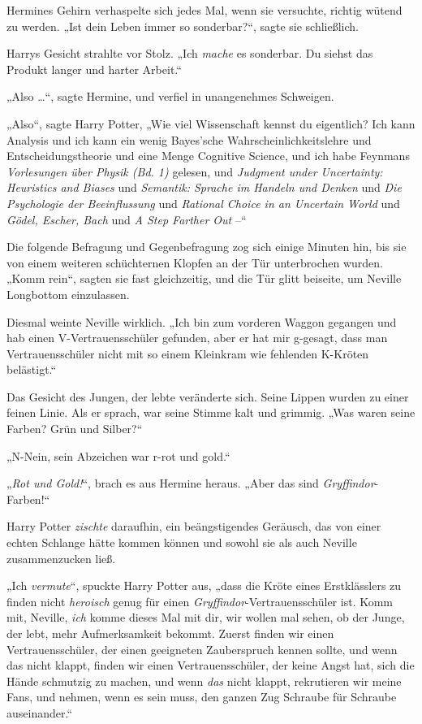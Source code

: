 Hermines Gehirn verhaspelte sich jedes Mal, wenn sie versuchte, richtig wütend zu werden. „Ist dein Leben immer so sonderbar?“, sagte sie schließlich. 

Harrys Gesicht strahlte vor Stolz. „Ich \emph{mache} es sonderbar. Du siehst das Produkt langer und harter Arbeit.“ 

„Also …“, sagte Hermine, und verfiel in unangenehmes Schweigen. 

„Also“, sagte Harry Potter, „Wie viel Wissenschaft kennst du eigentlich? Ich kann Analysis und ich kann ein wenig Bayes'sche Wahrscheinlichkeitslehre und Entscheidungstheorie und eine Menge Cognitive Science, und ich habe Feynmans \emph{Vorlesungen über Physik (Bd. 1)} gelesen, und \emph{Judgment under Uncertainty: Heuristics and Biases} und \emph{Semantik: Sprache im Handeln und Denken} und \emph{Die Psychologie der Beeinflussung} und \emph{Rational Choice in an Uncertain World} und \emph{Gödel, Escher, Bach} und \emph{A Step Farther Out} –“ 

Die folgende Befragung und Gegenbefragung zog sich einige Minuten hin, bis sie von einem weiteren schüchternen Klopfen an der Tür unterbrochen wurden. „Komm rein“, sagten sie fast gleichzeitig, und die Tür glitt beiseite, um Neville Longbottom einzulassen. 

Diesmal weinte Neville wirklich. „Ich bin zum vorderen Waggon gegangen und hab einen V-Vertrauensschüler gefunden, aber er hat mir g-gesagt, dass man Vertrauensschüler nicht mit so einem Kleinkram wie fehlenden K-Kröten belästigt.“ 

Das Gesicht des Jungen, der lebte veränderte sich. Seine Lippen wurden zu einer feinen Linie. Als er sprach, war seine Stimme kalt und grimmig. „Was waren seine Farben? Grün und Silber?“ 

„N-Nein, sein Abzeichen war r-rot und gold.“ 

„\emph{Rot und Gold!}“, brach es aus Hermine heraus. „Aber das sind \emph{Gryffindor}-Farben!“ 

Harry Potter \emph{zischte} daraufhin, ein beängstigendes Geräusch, das von einer echten Schlange hätte kommen können und sowohl sie als auch Neville zusammenzucken ließ. 

„Ich \emph{vermute}“, spuckte Harry Potter aus, „dass die Kröte eines Erstklässlers zu finden nicht \emph{heroisch} genug für einen \emph{Gryffindor}-Vertrauensschüler ist. Komm mit, Neville, \emph{ich} komme dieses Mal mit dir, wir wollen mal sehen, ob der Junge, der lebt, mehr Aufmerksamkeit bekommt. Zuerst finden wir einen Vertrauensschüler, der einen geeigneten Zauberspruch kennen sollte, und wenn das nicht klappt, finden wir einen Vertrauensschüler, der keine Angst hat, sich die Hände schmutzig zu machen, und wenn \emph{das} nicht klappt, rekrutieren wir meine Fans, und nehmen, wenn es sein muss, den ganzen Zug Schraube für Schraube auseinander.“ 

